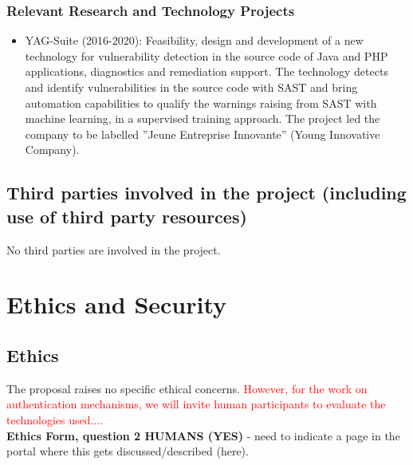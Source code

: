 \documentclass[a4paper,11pt]{article}
\begin{document}
\subsubsection*{Relevant Research and Technology Projects}

\begin{itemize}
\item YAG-Suite (2016-2020): Feasibility, design and development of a new technology for vulnerability detection in the source code of Java and PHP applications, diagnostics and remediation support. The technology detects and identify vulnerabilities in the source code with SAST and bring automation capabilities to qualify the warnings raising from SAST with machine learning, in a supervised training approach. The project led the company to be labelled ”Jeune Entreprise Innovante” (Young Innovative Company).
\end{itemize}








\subsection{Third parties involved in the project (including use of third party resources)}

No third parties are involved in the project.


\newpage

\section{Ethics and Security}

\subsection{Ethics}

The proposal raises no specific ethical concerns. \textcolor{red}{However, for the work on authentication mechanisms, we will invite human participants to evaluate the technologies used....}\\

\textbf{Ethics Form, question 2 HUMANS (YES)} - need to indicate a page in the portal where this gets discussed/described (here).
\end{document}
